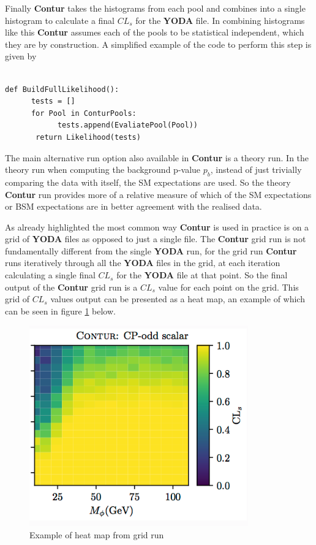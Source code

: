 Finally \textbf{Contur} takes the histograms from each pool and combines into a single histogram to calculate a final $CL_s$ for the \textbf{YODA} file. In combining histograms like this \textbf{Contur} assumes each of the pools to be statistical independent, which they are by construction. A simplified example of the code to perform this step is given by

\begin{code}
\label{code:full_likelihood}
\begin{verbatim}

def BuildFullLikelihood():
      tests = []
      for Pool in ConturPools:
            tests.append(EvaliatePool(Pool))
       return Likelihood(tests)
\end{verbatim}
\end{code}

The main alternative run option also available in \textbf{Contur} is a theory run. In the theory run when computing the background p-value $p_b$, instead of just trivially comparing the data with itself, the SM expectations are used. So the theory \textbf{Contur} run provides more of a relative measure of which of the SM expectations or BSM expectations are in better agreement with the realised data.

As already highlighted the most common way \textbf{Contur} is used in practice is on a grid of \textbf{YODA} files as opposed to just a single file. The \textbf{Contur} grid run is not fundamentally different from the single \textbf{YODA} run, for the grid run \textbf{Contur} runs iteratively through all the \textbf{YODA} files in the grid, at each iteration calculating a single final $CL_{s}$ for the \textbf{YODA} file at that point. So the final output of the \textbf{Contur} grid run is a $CL_{s}$ value for each point on the grid. This grid of $CL_{s}$ values output can be presented as a heat map, an example of which can be seen in figure \ref{fig:example_heatmap} below.


\begin{figure}[H]
\centering
\includegraphics[scale=1]{plots/example_heatmap.png}
\caption{Example of heat map from grid run}
\label{fig:example_heatmap}
\end{figure}
